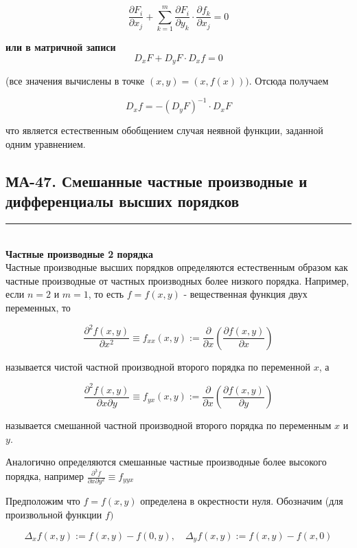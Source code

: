 \documentclass[a4paper,12pt]{article} %
\newcommand{\HRule}{\rule{\linewidth}{0.5mm}}
\begin{document}
$$
\frac{\partial F_{i}}{\partial x_{j}}+\sum_{k=1}^{m} \frac{\partial F_{i}}{\partial y_{k}} \cdot \frac{\partial f_{k}}{\partial x_{j}}=0
$$

\textbf{или в матричной записи}
$$
D_{x} F+D_{y} F \cdot D_{x} f=0
$$

(все значения вычислены в точке $(x, y)=(x, f(x)))$. Отсюда получаем

$$
D_{x} f=-\left(D_{y} F\right)^{-1} \cdot D_{x} F
$$

что является естественным обобщением случая неявной функции, заданной одним уравнением.



\newpage
\begin{LARGE}
\begin{center}
	\section{МА-47. Смешанные частные производные и дифференциалы высших порядков }
\end{center}
\end{LARGE}
\HRule \\


\textbf{Частные производные 2 порядка}\\
Частные производные высших порядков определяются естественным образом как частные производные от частных производных более низкого порядка. Например, если $n=2$ и $m=1$, то есть $f=f(x, y)$ - вещественная функция двух переменных, то

$$
\frac{\partial^{2} f(x, y)}{\partial x^{2}} \equiv f_{x x}(x, y):=\frac{\partial}{\partial x}\left(\frac{\partial f(x, y)}{\partial x}\right)
$$

называется чистой частной производной второго порядка по переменной $x$, а

$$
\frac{\partial^{2} f(x, y)}{\partial x \partial y} \equiv f_{y x}(x, y):=\frac{\partial}{\partial x}\left(\frac{\partial f(x, y)}{\partial y}\right)
$$

называется смешанной частной производной второго порядка по переменным $x$ и $y$.

Аналогично определяются смешанные частные производные более высокого порядка, например $\frac{\partial^{3} f}{\partial x \partial y^{2}} \equiv f_{y y x}$

Предположим что $f=f(x, y)$ определена в окрестности нуля. Обозначим (для произвольной функции $f)$

$$
\Delta_{x} f(x, y):=f(x, y)-f(0, y), \quad \Delta_{y} f(x, y):=f(x, y)-f(x, 0)
$$
\end{document}
